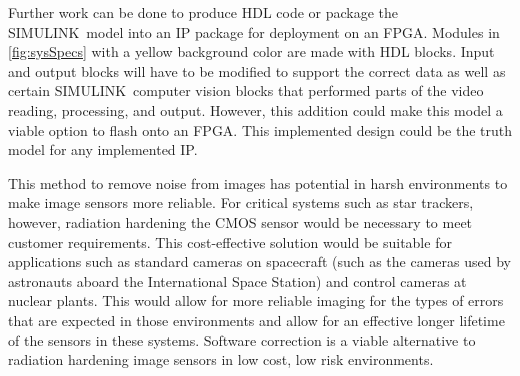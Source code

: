 \par Further work can be done to produce HDL code or package the SIMULINK\textregisteredmark\ model into an IP package for deployment on an FPGA. Modules in \autoref{fig:sysSpecs} with a yellow background color are made with HDL blocks. Input and output blocks will have to be modified to support the correct data as well as certain SIMULINK\textregisteredmark\ computer vision blocks that performed parts of the video reading, processing, and output. However, this addition could make this model a viable option to flash onto an FPGA. This implemented design could be the truth model for any implemented IP.
\par This method to remove noise from images has potential in harsh environments to make image sensors more reliable. For critical systems such as star trackers, however, radiation hardening the CMOS sensor would be necessary to meet customer requirements. This cost-effective solution would be suitable for applications such as standard cameras on spacecraft (such as the cameras used by astronauts aboard the International Space Station) and control cameras at nuclear plants. This would allow for more reliable imaging for the types of errors that are expected in those environments and allow for an effective longer lifetime of the sensors in these systems. Software correction is a viable alternative to radiation hardening image sensors in low cost, low risk environments.